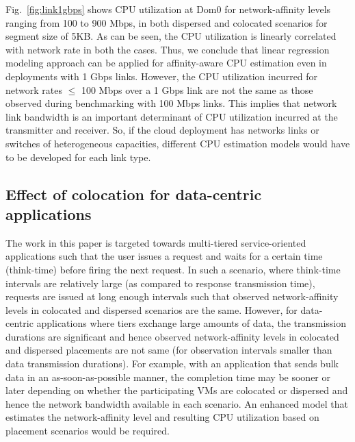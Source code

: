 Fig.~\ref{fig:link1gbps} shows CPU utilization at Dom0
for network-affinity levels ranging from 100 to 900 Mbps, in 
both dispersed and colocated scenarios for segment size of
5KB. As can be seen, the CPU utilization is linearly correlated with
network rate in both the cases. 
Thus, we conclude that 
linear regression modeling approach can be applied for affinity-aware
CPU estimation even in deployments with 1 Gbps links. However, 
the CPU utilization
incurred for network rates $\le$ 100 Mbps over a 1 Gbps link are not the 
same as those observed during benchmarking with 100 Mbps links. 
This implies that network link bandwidth is an important
determinant of CPU utilization incurred at the transmitter and
receiver. So, if the cloud deployment has networks links or switches 
of heterogeneous capacities,
different CPU estimation models would have to be
developed for each link type.

\subsection{Effect of colocation for data-centric applications}
The work in this paper is targeted towards multi-tiered service-oriented
applications such that the user issues a request and waits 
for a certain time (think-time) before firing the next request.
In such a scenario, where think-time intervals are relatively large
(as compared to response transmission time),
requests are issued at long enough intervals
such that observed network-affinity levels
in colocated and dispersed scenarios are the same. 
However, for data-centric applications 
where tiers exchange large amounts of data, the transmission
durations are significant and hence 
observed network-affinity levels in colocated
and dispersed placements are not same (for observation intervals
smaller than data transmission durations).
For example, with an application
that sends bulk data in an as-soon-as-possible manner, the 
completion time may be sooner or later depending
on whether the participating VMs are colocated or dispersed
and hence the network bandwidth available in each scenario. 
An enhanced model that estimates the network-affinity level 
and resulting CPU utilization based on placement scenarios would
be required.

